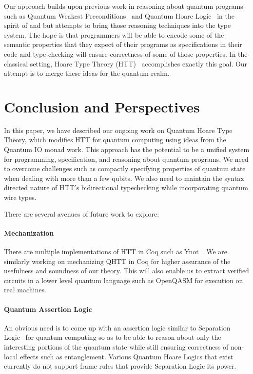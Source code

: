 \documentclass[acmsmall,nonacm,timestamp]{acmart}
\begin{document}
Our approach builds upon previous work in reasoning about quantum programs such as Quantum Weakest Preconditions~\cite{dhondt_quantum_2006} and Quantum Hoare Logic~\cite{ying_floydhoare_2012} in the spirit of \citet{hoare_axiomatic_1969} and \citet{dijkstra_discipline_1976} but attempts to bring those reasoning techniques into the type system. The hope is that programmers will be able to encode some of the semantic properties that they expect of their programs as specifications in their code and type checking will ensure correctness of some of those properties. In the classical setting, Hoare Type Theory (HTT)~\cite{nanevski_hoare_2008} accomplishes exactly this goal. Our attempt is to merge these ideas for the quantum realm.


\section{Conclusion and Perspectives}
\label{sec:conclusion}
In this paper, we have described our ongoing work on Quantum Hoare Type Theory, which modifies HTT for quantum computing using ideas from the Quantum IO monad work. This approach has the potential to be a unified system for programming, specification, and reasoning about quantum programs. We need to overcome challenges such as compactly specifying properties of quantum state when dealing with more than a few qubits. We also need to maintain the syntax directed nature of HTT's bidirectional typechecking while incorporating quantum wire types.

There are several avenues of future work to explore:

\paragraph{Mechanization} There are multiple implementations of HTT in Coq such as Ynot~\cite{ynot2008}. We are similarly working on mechanizing QHTT in Coq for higher assurance of the usefulness and soundness of our theory. This will also enable us to extract verified circuits in a lower level quantum language such as OpenQASM for execution on real machines.

\paragraph{Quantum Assertion Logic} An obvious need is to come up with an assertion logic similar to Separation Logic~\cite{reynolds2002} for quantum computing so as to be able to reason about only the interesting portions of the quantum state while still ensuring correctness of non-local effects such as entanglement. Various Quantum Hoare Logics that exist~\cite{ying_floydhoare_2012} currently do not support frame rules that provide Separation Logic its power.
\end{document}
